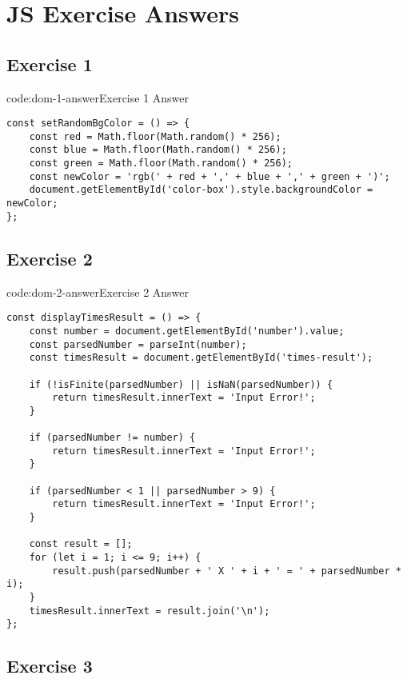 \section{JS Exercise Answers} \label{sect:js-exercise-answers}

\subsection*{Exercise 1}

\begin{codeenv}{code:dom-1-answer}{Exercise 1 Answer}\begin{verbatim}
const setRandomBgColor = () => {
    const red = Math.floor(Math.random() * 256);
    const blue = Math.floor(Math.random() * 256);
    const green = Math.floor(Math.random() * 256);
    const newColor = 'rgb(' + red + ',' + blue + ',' + green + ')';
    document.getElementById('color-box').style.backgroundColor = newColor;
};
\end{verbatim}
\end{codeenv}

\subsection*{Exercise 2}

\begin{codeenv}{code:dom-2-answer}{Exercise 2 Answer}\begin{verbatim}
const displayTimesResult = () => {
    const number = document.getElementById('number').value;
    const parsedNumber = parseInt(number);
    const timesResult = document.getElementById('times-result');

    if (!isFinite(parsedNumber) || isNaN(parsedNumber)) {
        return timesResult.innerText = 'Input Error!';
    }
    
    if (parsedNumber != number) {
        return timesResult.innerText = 'Input Error!';
    }

    if (parsedNumber < 1 || parsedNumber > 9) {
        return timesResult.innerText = 'Input Error!';
    }

    const result = [];
    for (let i = 1; i <= 9; i++) {
        result.push(parsedNumber + ' X ' + i + ' = ' + parsedNumber * i);
    }
    timesResult.innerText = result.join('\n');
};
\end{verbatim}
\end{codeenv}

\subsection*{Exercise 3}

